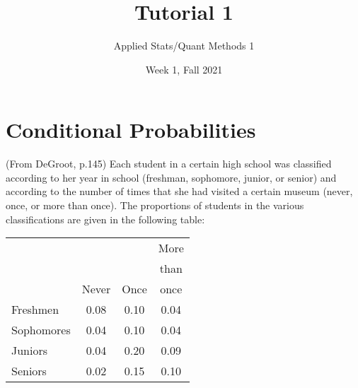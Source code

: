 \documentclass[12pt,letterpaper]{article}
\title{Tutorial 1}
\date{Week 1, Fall 2021}
\author{Applied Stats/Quant Methods 1}
\begin{document}
	\maketitle
	
%	
%

\section{Conditional Probabilities}

(From DeGroot, p.145) Each student in a certain high school was classified according to her year in school (freshman, sophomore, junior, or senior) and according to the number of times that she had visited a certain museum (never, once, or more than once).  The proportions of students in the various classifications are given in the following table:

\begin{center}
	\begin{tabular}{lccc}
		& & & More\\
		& & & than\\
		& Never & Once & once\\
		\hline
		Freshmen  & 0.08 & 0.10 & 0.04\\
		Sophomores  & 0.04 & 0.10 & 0.04\\
		Juniors		& 0.04 & 0.20 & 0.09\\
		Seniors		& 0.02 & 0.15 & 0.10\\
	\end{tabular}
\end{center}
\end{document}
